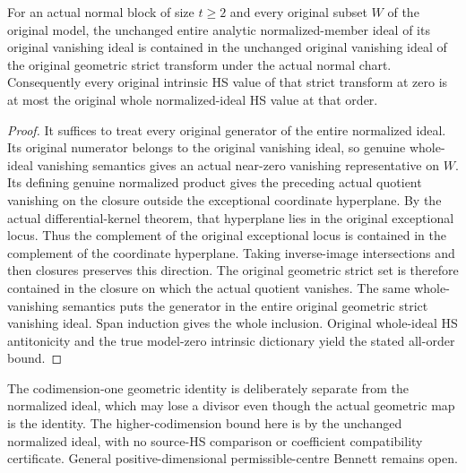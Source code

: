 \begin{theorem}
\label{hir:actual-normal-geometric-strict-normalized-inclusion}
For an actual normal block of size $t\ge2$ and every original subset
$W$ of the original model, the unchanged entire analytic
normalized-member ideal of its original vanishing ideal is contained
in the unchanged original vanishing ideal of the original geometric
strict transform under the actual normal chart. Consequently every
original intrinsic HS value of that strict transform at zero is at
most the original whole normalized-ideal HS value at that order.
\leanok
\end{theorem}
\begin{proof}
It suffices to treat every original generator of the entire normalized
ideal. Its original numerator belongs to the original vanishing ideal,
so genuine whole-ideal vanishing semantics gives an actual near-zero
vanishing representative on $W$. Its defining genuine normalized
product gives the preceding actual quotient vanishing on the closure
outside the exceptional coordinate hyperplane. By the actual
differential-kernel theorem, that hyperplane lies in the original
exceptional locus. Thus the complement of the original exceptional
locus is contained in the complement of the coordinate hyperplane.
Taking inverse-image intersections and then closures preserves this
direction. The original geometric strict set is therefore contained
in the closure on which the actual quotient vanishes. The same
whole-vanishing semantics puts the generator in the entire original
geometric strict vanishing ideal. Span induction gives the whole
inclusion. Original whole-ideal HS antitonicity and the true model-zero
intrinsic dictionary yield the stated all-order bound.
\end{proof}

The codimension-one geometric identity is deliberately separate from
the normalized ideal, which may lose a divisor even though the actual
geometric map is the identity. The higher-codimension bound here is
by the unchanged normalized ideal, with no source-HS comparison or
coefficient compatibility certificate. General positive-dimensional
permissible-centre Bennett remains open.
